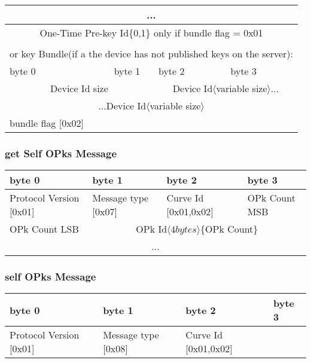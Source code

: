 \documentclass[a4paper,11pt]{article}
\begin{document}
\begin{center}
\begin{tabular}{ | p{1.4in} | p{1.4in} | p{1.4in} | p{1.4in} |}
        \multicolumn{4}{|c|}{...}\\
        \hline
        \multicolumn{4}{|c|}{One-Time Pre-key Id\{0,1\} only if bundle flag = 0x01}\\
        \hline
        \multicolumn{4}{c}{}\\
        \multicolumn{4}{c}{or key Bundle(if a the device has not published keys on the server):}\\
        \hline
        \cellcolor[gray]{0.95} byte 0 & \cellcolor[gray]{0.95} byte 1 & \cellcolor[gray]{0.95} byte 2 & \cellcolor[gray]{0.95}byte 3\\
        \hline
        \multicolumn{2}{|c|}{Device Id size}&\multicolumn{2}{|c|}{Device Id$\langle$variable size$\rangle$...}\\
        \hline
        \multicolumn{4}{|c|}{...Device Id$\langle$variable size$\rangle$}\\
        \hline
        bundle flag [0x02]\\
        \cline{1-1}
      \end{tabular}
      \end{center}
      
    \subsubsection{get Self OPks Message}
      \begin{center}
      \begin{tabular}{ | p{1.4in} | p{1.4in} | p{1.4in} | p{1.4in} |}
        \hline
        \cellcolor[gray]{0.85} byte 0 & \cellcolor[gray]{0.85} byte 1 & \cellcolor[gray]{0.85} byte 2 & \cellcolor[gray]{0.85}byte 3\\
        \hline
        Protocol Version [0x01] & Message type [0x07] & Curve Id [0x01,0x02] & OPk Count MSB\\
        \hline
        OPk Count LSB & \multicolumn{3}{|c|}{OPk Id$\langle 4bytes\rangle $\{OPk Count\}}\\
        \cline{1-1}
        \multicolumn{4}{|c|}{...}\\
        \hline
      \end{tabular}
      \end{center}

    \subsubsection{self OPks Message}
      \begin{center}
      \begin{tabular}{ | p{1.4in} | p{1.4in} | p{1.4in} | p{1.4in} |}
        \hline
        \cellcolor[gray]{0.85} byte 0 & \cellcolor[gray]{0.85} byte 1 & \cellcolor[gray]{0.85} byte 2 & \cellcolor[gray]{0.85}byte 3\\
        \hline
        Protocol Version [0x01] & Message type [0x08] & Curve Id [0x01,0x02] & \\
        \hline
      \end{tabular}
      \end{center}
      
\end{document}
